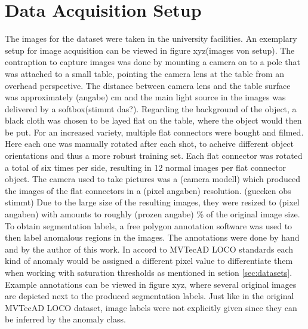 



\section{Data Acquisition Setup}
\label{sec:faltconnectordataacquisiton}

The images for the dataset were taken in the university facilities. An exemplary setup for image acquisition can be viewed in figure xyz(images von setup). The contraption to capture images was 
done by mounting a camera on to a pole that was attached to a small table, pointing the camera lens at the table from an overhead perspective. The distance between camera lens and the table surface was approximately (angabe) cm and the main light source in the 
images was delivered by a softbox(stimmt das?). Regarding the background of the object, a black cloth was chosen to be layed flat on the table, where the object would then be put. For 
an increased variety, multiple flat connectors were bought and filmed. Here each one was manually rotated after each shot, to acheive different object orientations and thus a more robust training 
set. Each flat connector was rotated a total of six times per side, resulting in 12 normal images per flat connector object. \newline
The camera used to take pictures was a (camera modell) which produced the images of the flat connectors in a (pixel angaben) resolution. (guccken obs stimmt) Due to the large size of the resulting 
images, they were resized to (pixel angaben) with amounts to roughly (prozen angabe) \% of the original image size.\newline
To obtain segmentation labels, a free polygon annotation software was used to then label anomalous regions in the images. The annotations were done by hand and by the author of this work. In accord to 
MVTecAD LOCO standards \cite{LOCODentsAndScratchesBergmann2022} each kind of anomaly would be assigned a different pixel value to differentiate them when working with saturation thresholds 
as mentioned in setion \ref{sec:datasets}. Example annotations can be viewed in figure xyz, where several original images are depicted next to the produced segmentation labels. Just like in the 
original MVTecAD LOCO dataset, image labels were not explicitly given since they can be inferred by the anomaly class.






